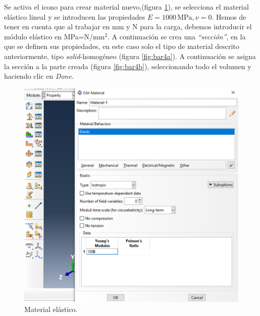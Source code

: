 \documentclass[spanish,a4paper,12pt]{article}
\begin{document}
Se activa el icono para crear material nuevo,(figura \ref{fig:bar3}),
se selecciona el material elástico lineal y se introducen las propiedades $E=1000\,\text{MPa}, \nu=0$. Hemos de tener en cuenta que al trabajar en mm y N para la carga, debemos introducir el módulo elástico en MPa=N/mm$^2$.  A continuación se crea una \emph{``sección''}, en la que se definen sus propiedades, en este caso solo el tipo de material descrito anteriormente, tipo \emph{solid}-homogéneo (figura \ref{fig:bar4a}).
A continuación se asigna la sección a la parte creada (figura \ref{fig:bar4b}), seleccionando todo el volumen y haciendo clic en \emph{Done}.
\begin{figure}[h!tp]
\centering
\includegraphics[scale=0.4]{capturas/prop0.png}
\caption{Material elástico.}
\label{fig:bar3}
\end{figure}
\end{document}
